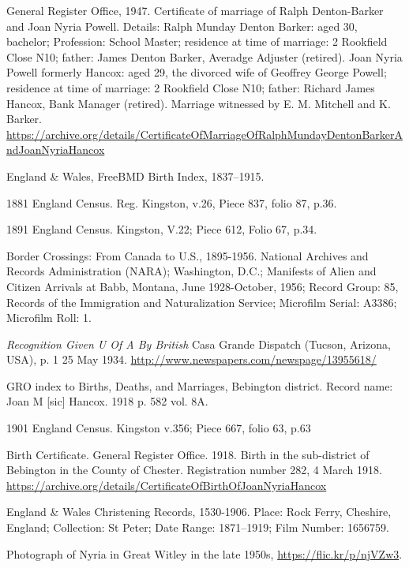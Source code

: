 \begin{thebibliography}{99}
	General Register Office, 1947. Certificate of marriage of Ralph Denton-Barker and Joan Nyria Powell.
	Details: Ralph Munday Denton Barker: aged 30, bachelor; Profession: School Master;
	residence at time of marriage: 2 Rookfield Close N10; father: James Denton Barker, Averadge Adjuster (retired).
	Joan Nyria Powell formerly Hancox: aged 29, the divorced wife of Geoffrey George Powell;
	residence at time of marriage: 2 Rookfield Close N10; father: Richard James Hancox, Bank Manager (retired).
	Marriage witnessed by E. M. Mitchell and K. Barker.
	\url{https://archive.org/details/CertificateOfMarriageOfRalphMundayDentonBarkerAndJoanNyriaHancox}

	England \& Wales, FreeBMD Birth Index, 1837--1915.

	1881 England Census. Reg. Kingston, v.26, Piece 837, folio 87, p.36.

	1891 England Census. Kingston, V.22; Piece 612, Folio 67, p.34.

	Border Crossings: From Canada to U.S., 1895-1956.
	National Archives and Records Administration (NARA); Washington, D.C.; Manifests of Alien and Citizen Arrivals at Babb, Montana, June 1928-October, 1956; Record Group: 85, Records of the Immigration and Naturalization Service; Microfilm Serial: A3386; Microfilm Roll: 1.

	\emph{Recognition Given U Of A By British}
	Casa Grande Dispatch (Tucson, Arizona, USA), p. 1 25 May 1934. \url{http://www.newspapers.com/newspage/13955618/}

	GRO index to Births, Deaths, and Marriages,
	Bebington district. Record name: Joan M [sic] Hancox.
	1918 p. 582 vol. 8A.

	1901 England Census. Kingston v.356; Piece 667, folio 63, p.63

	Birth Certificate. General Register Office.
	1918. Birth in the sub-district of Bebington in the County of Chester.
	Registration number 282, 4 March 1918.
	\url{https://archive.org/details/CertificateOfBirthOfJoanNyriaHancox}

	England \& Wales Christening Records, 1530-1906.
	Place: Rock Ferry, Cheshire, England; Collection: St Peter;
	Date Range: 1871--1919; Film Number: 1656759.

	Photograph of Nyria in Great Witley in the late 1950s,
	\url{https://flic.kr/p/njVZw3}.


\end{thebibliography}
